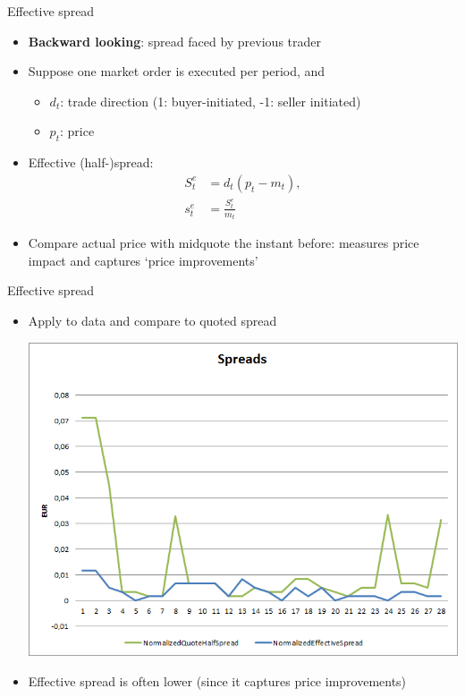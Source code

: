 \documentclass[english,10pt]{beamer}
\begin{document}
\begin{frame}{Effective spread}
	\begin{itemize}
		\item \textbf{Backward looking}: spread faced by previous trader
		\item Suppose one market order is executed per period, and
		\begin{itemize}
			\item $d_t$: trade direction (1: buyer-initiated, -1: seller initiated)
			\item $p_t$:  price
		\end{itemize}
		\item \alert{Effective (half-)spread}: 
		\begin{align*}
		S^e_t & = d_t(p_t-m_{t}), \\
		s^e_t & = \frac{S^e_t}{m_{t}}
		\end{align*}
		\item Compare actual price with midquote the instant before: measures price impact and captures `price improvements'
	\end{itemize}
\end{frame}


\begin{frame}{Effective spread}
	\begin{itemize}
		\item Apply to data and compare to quoted spread
		\begin{center}
			\includegraphics[scale=0.39]{pics/L2_effectivespread}
		\end{center}
		\item Effective spread is often lower (since it captures price improvements)
	\end{itemize}
\end{frame}
\end{document}

